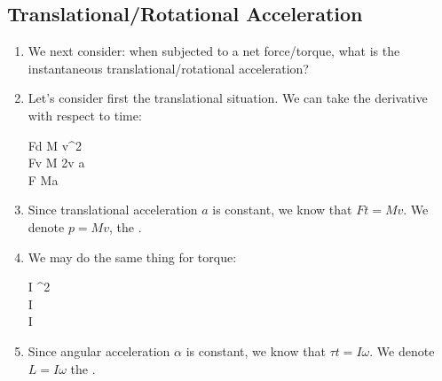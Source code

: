 \subsection{Translational/Rotational Acceleration}

\begin{enumerate}
  \item We next consider: when subjected to a net force/torque,
  what is the instantaneous translational/rotational acceleration?

  \item Let's consider first the translational situation. We can take
  the derivative with respect to time:

  \begin{nedqn}
     Fd
  \eqcol
     \half M v^2
  \\
    Fv
  \eqcol
    \half M \cdot 2v \cdot a
  \\
    F
  \eqcol
    Ma
  \end{nedqn}

  \item Since translational acceleration $a$ is constant, we know that
  $Ft = Mv$. We denote $p = Mv$, the .

  \item We may do the same thing for torque:

  \begin{nedqn}
     \tau \theta
  \eqcol
     \half I \omega^2
  \\
    \tau \omega
  \eqcol
    \half I \omega \cdot \alpha
  \\
    \tau
  \eqcol
    I \alpha
  \end{nedqn}

  \item Since angular acceleration $\alpha$ is constant, we know that
  $\tau t = I\omega$. We denote $L = I \omega$ the .

\end{enumerate}
